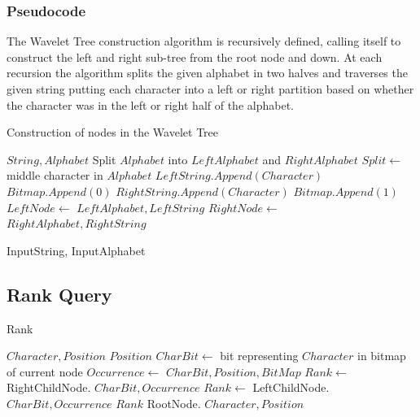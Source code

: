 \subsubsection{Pseudocode}
\label{sec:nodeconstruction}
The Wavelet Tree construction algorithm is recursively defined, calling itself to construct the left and right sub-tree from the root node and down. At each recursion the algorithm splits the given alphabet in two halves and traverses the given string putting each character into a left or right partition based on whether the character was in the left or right half of the alphabet.

\begin{algorithm}
\caption{Construction of nodes in the Wavelet Tree}
\label{alg:ConstructNode}
\begin{algorithmic}
 {$String, Alphabet$}
	\State \Return
\EndIf
\State Split $Alphabet$ into $LeftAlphabet$ and $RightAlphabet$
\State $Split \gets$ middle character in $Alphabet$
		\State $LeftString.Append(Character)$
		\State $Bitmap.Append(0)$
	\Else
		\State $RightString.Append(Character)$
		\State $Bitmap.Append(1)$
	\EndIf
\EndFor
\State $LeftNode \gets$  {$LeftAlphabet, LeftString$}
\State $RightNode \gets$  {$RightAlphabet, RightString$}
\EndFunction

\State {} {InputString, InputAlphabet}
\end{algorithmic}
\end{algorithm}

\subsection{Rank Query}
\begin{algorithm}
\caption{Rank}
\label{alg:rank}
\begin{algorithmic} 
 {$Character, Position$}
\State \Return $Position$
\EndIf
\State $CharBit \gets$ bit representing $Character$ in bitmap of current node
\State $Occurrence \gets$  {$CharBit, Position, BitMap$}
	\State $Rank \gets$ RightChildNode. {$CharBit, Occurrence$}
\Else
	\State $Rank \gets$ LeftChildNode. {$CharBit, Occurrence$}
\EndIf
\State \Return $Rank$ 
\EndFunction
\State RootNode. {$Character, Position$}
\end{algorithmic}
\end{algorithm}

